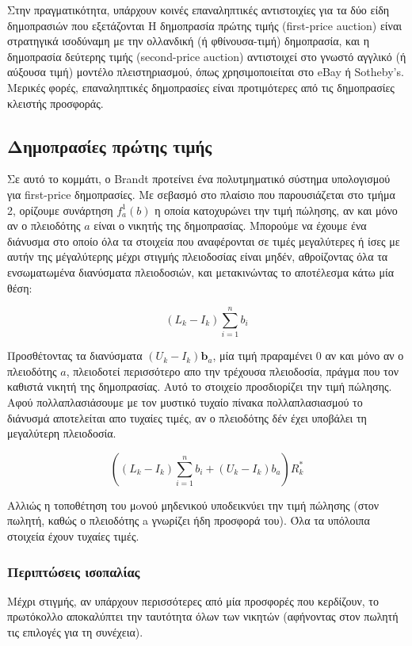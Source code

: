 \documentclass[letterpaper,11pt]{article}
\begin{document}
Στην πραγματικότητα, υπάρχουν κοινές επαναληπτικές αντιστοιχίες για τα δύο είδη δημοπρασιών που εξετάζονται Η δημοπρασία πρώτης τιμής (first-price
auction) είναι στρατηγικά ισοδύναμη με την ολλανδική (ή φθίνουσα-τιμή) δημοπρασία, και η δημοπρασία δεύτερης τιμής (second-price auction)
αντιστοιχεί στο γνωστό αγγλικό (ή αύξουσα τιμή) μοντέλο πλειστηριασμού, όπως χρησιμοποιείται στο eBay ή Sotheby's. Μερικές φορές, επαναληπτικές
δημοπρασίες είναι προτιμότερες από τις δημοπρασίες κλειστής προσφοράς.

	\subsection{Δημοπρασίες πρώτης τιμής} Σε αυτό το κομμάτι, ο Brandt προτείνει ένα πολυτμηματικό σύστημα υπολογισμού για first-price δημοπρασίες. Με
σεβασμό στο πλαίσιο που παρουσιάζεται στο τμήμα 2, ορίζουμε συνάρτηση $f_a^1(b)$ η οποία κατοχυρώνει την τιμή πώλησης, αν και μόνο αν ο πλειοδότης $a$
είναι ο νικητής της δημοπρασίας. Μπορούμε να έχουμε ένα διάνυσμα στο οποίο όλα τα στοιχεία που αναφέρονται σε τιμές μεγαλύτερες ή ίσες με αυτήν της
μέγαλύτερης μέχρι στιγμής πλειοδοσίας είναι μηδέν, αθροίζοντας όλα τα ενσωματωμένα διανύσματα πλειοδοσιών, και μετακινώντας το αποτέλεσμα κάτω μία
θέση:

\begin{displaymath}
	(L_k-I_k) \sum_{i=1}^{n} b_i
\end{displaymath}

Προσθέτοντας τα διανύσματα $(U_k − I_k )\textbf{b}_a$, μία τιμή πραραμένει 0 αν και μόνο αν ο πλειοδότης $a$, πλειοδοτεί περισσότερο απο την
τρέχουσα πλειοδοσία, πράγμα που τον καθιστά νικητή της δημοπρασίας. Αυτό το στοιχείο προσδιορίζει την τιμή πώλησης. Αφού πολλαπλασιάσουμε με τον
μυστικό τυχαίο πίνακα πολλαπλασιασμού το διάνυσμά αποτελείται απο τυχαίες τιμές, αν ο πλειοδότης δέν έχει υποβάλει τη μεγαλύτερη πλειοδοσία.

\begin{displaymath}
	\left ( (L_k-I_k) \sum_{i=1}^{n} b_i + (U_k - I_k)b_a \right ) R^*_k
\end{displaymath}

Αλλιώς η τοποθέτηση του μoνού μηδενικού υποδεικνύει την τιμή πώλησης (στον πωλητή, καθώς ο πλειοδότης a γνωρίζει ήδη προσφορά του). Όλα τα υπόλοιπα
στοιχεία έχουν τυχαίες τιμές.

\subsubsection{Περιπτώσεις ισοπαλίας}
Μέχρι στιγμής, αν υπάρχουν περισσότερες από μία προσφορές που κερδίζουν, το πρωτόκολλο αποκαλύπτει την ταυτότητα όλων των νικητών (αφήνοντας στον
πωλητή τις επιλογές για τη συνέχεια).
\end{document}
